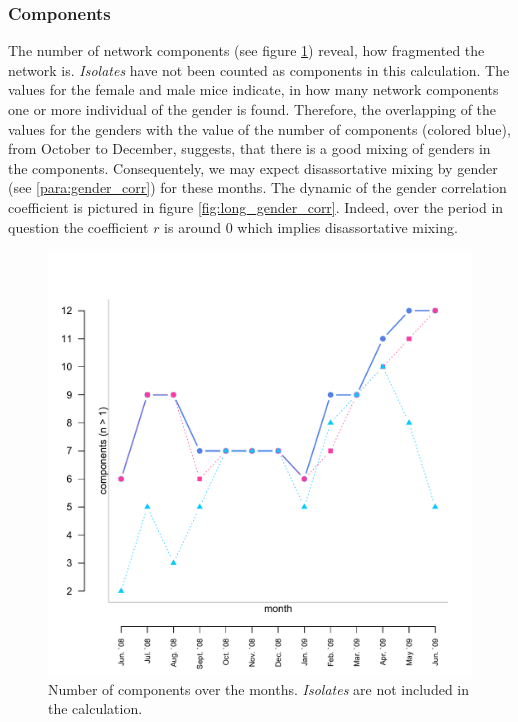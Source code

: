 \subsubsection*{Components}

The number of network components (see figure \ref{fig:long_comps}) reveal, how fragmented  the network is. \textit{Isolates} have not been counted as components in this calculation. The values for the female and male mice indicate, in how many network components one or more individual of the gender is found. Therefore, the overlapping of the values for the genders with the value of the number of components (colored blue), from October to December, suggests, that there is a good mixing of genders in the components. Consequentely, we may expect disassortative mixing by gender (see \ref{para:gender_corr}) for these months. The dynamic of the gender correlation coefficient is pictured in figure \ref{fig:long_gender_corr}. Indeed, over the period in question the coefficient $r$ is around 0 which implies disassortative mixing.

\begin{figure}[htpb]
\begin{center}
  \includegraphics[width=.6\textwidth]{assets/pdf/long_comps.pdf}
  \caption[Number of components over the months]{Number of components over the months. \textit{Isolates} are not included in the calculation.}
  \label{fig:long_comps}
\end{center}
\end{figure}


% 

